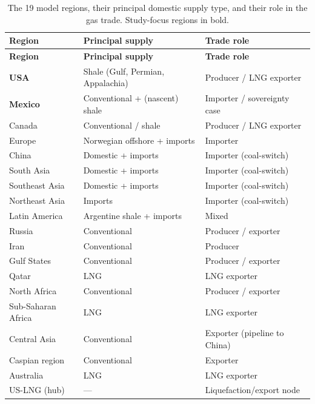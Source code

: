 \documentclass[11pt]{article}
\begin{document}
\begin{longtable}{@{}lll@{}}
\caption{The 19 model regions, their principal domestic supply type, and
their role in the gas trade. Study-focus regions in bold.}\label{tab:regions}\\
\toprule
\textbf{Region} & \textbf{Principal supply} & \textbf{Trade role} \\
\midrule
\endfirsthead
\toprule
\textbf{Region} & \textbf{Principal supply} & \textbf{Trade role} \\
\midrule
\endhead
\textbf{USA}            & Shale (Gulf, Permian, Appalachia) & Producer / LNG exporter \\
\textbf{Mexico}         & Conventional + (nascent) shale    & Importer / sovereignty case \\
Canada                  & Conventional / shale              & Producer / LNG exporter \\
Europe                  & Norwegian offshore + imports      & Importer \\
China                   & Domestic + imports                & Importer (coal-switch) \\
South Asia              & Domestic + imports                & Importer (coal-switch) \\
Southeast Asia          & Domestic + imports                & Importer (coal-switch) \\
Northeast Asia          & Imports                           & Importer (coal-switch) \\
Latin America           & Argentine shale + imports         & Mixed \\
Russia                  & Conventional                      & Producer / exporter \\
Iran                    & Conventional                      & Producer \\
Gulf States             & Conventional                      & Producer / exporter \\
Qatar                   & LNG                               & LNG exporter \\
North Africa            & Conventional                      & Producer / exporter \\
Sub-Saharan Africa      & LNG                               & LNG exporter \\
Central Asia            & Conventional                      & Exporter (pipeline to China) \\
Caspian region          & Conventional                      & Exporter \\
Australia               & LNG                               & LNG exporter \\
US-LNG (hub)            & ---                               & Liquefaction/export node \\
\bottomrule
\end{longtable}
\end{document}
